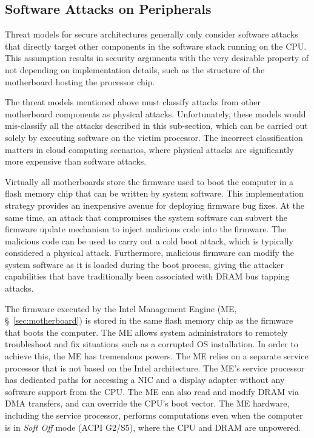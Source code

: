\subsection{Software Attacks on Peripherals}
\label{sec:device_attacks}

Threat models for secure architectures generally only consider software attacks
that directly target other components in the software stack running on the CPU.
This assumption results in security arguments with the very desirable property
of not depending on implementation details, such as the structure of the
motherboard hosting the processor chip.

The threat models mentioned above must classify attacks from other motherboard
components as physical attacks. Unfortunately, these models would mis-classify
all the attacks described in this sub-section, which can be carried out solely
by executing software on the victim processor. The incorrect classification
matters in cloud computing scenarios, where physical attacks are significantly
more expensive than software attacks.

Virtually all motherboards store the firmware used to boot the computer in a
flash memory chip that can be written by system software. This implementation
strategy provides an inexpensive avenue for deploying firmware bug fixes. At
the same time, an attack that compromises the system software can subvert the
firmware update mechanism to inject malicious code into the firmware. The
malicious code can be used to carry out a cold boot attack, which is typically
considered a physical attack. Furthermore, malicious firmware can modify the
system software as it is loaded during the boot process, giving the attacker
capabilities that have traditionally been associated with DRAM bus tapping
attacks.

The firmware executed by the Intel Management Engine (ME,
\S~\ref{sec:motherboard}) is stored in the same flash memory chip as the
firmware that boots the computer. The ME allows system administrators to
remotely troubleshoot and fix situations such as a corrupted OS installation.
In order to achieve this, the ME has tremendous powers. The ME relies on a
separate service processor that is not based on the Intel architecture. The
ME's service processor has dedicated paths for accessing a NIC and a display
adapter without any software support from the CPU. The ME can also read and
modify DRAM via DMA transfers, and can override the CPU's boot vector. The ME
hardware, including the service processor, performs computations even when the
computer is in \textit{Soft Off} mode (ACPI G2/S5), where the CPU and DRAM are
unpowered.

